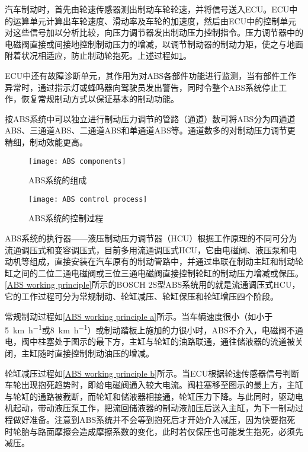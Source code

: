 \documentclass[UTF8]{ctexart}
\numberwithin{figure}{section}
\numberwithin{table}{section}
\begin{document}
汽车制动时，首先由轮速传感器测出制动车轮轮速，并将信号送入ECU。ECU中的运算单元计算出车轮速度、滑动率及车轮的加速度，然后由ECU中的控制单元对这些信号加以分析比较，向压力调节器发出制动压力控制指令。压力调节器中的电磁阀直接或间接地控制制动压力的增减，以调节制动器的制动力矩，使之与地面附着状况相适应，防止制动轮抱死。上述过程如\cref{ABS control process}。

ECU中还有故障诊断单元，其作用为对ABS各部件功能进行监测，当有部件工作异常时，通过指示灯或蜂鸣器向驾驶员发出警告，同时令整个ABS系统停止工作，恢复常规制动方式以保证基本的制动功能。

按ABS系统中可以独立进行制动压力调节的管路（通道）数可将ABS分为四通道ABS、三通道ABS、二通道ABS和单通道ABS等。通道数多的对制动压力调节更精细，制动效能更高。

\begin{figure}[htbp]
	\centering
	\begin{minipage}[b]{0.8\textwidth}
		\centering
		\texttt{[image: ABS components]}
		\caption{ABS系统的组成}
		\label{ABS components}
	\end{minipage}
	\begin{minipage}[b]{0.8\textwidth}
		\centering
		\texttt{[image: ABS control process]}
		\caption{ABS系统的控制过程}
		\label{ABS control process}
	\end{minipage}
\end{figure}

ABS系统的执行器——液压制动压力调节器（HCU）根据工作原理的不同可分为流通调压式和变容调压式，目前多用流通调压式HCU，它由电磁阀、液压泵和电动机等组成，直接安装在汽车原有的制动管路中，并通过串联在制动主缸和制动轮缸之间的二位二通电磁阀或三位三通电磁阀直接控制轮缸的制动压力增减或保压。\cref{ABS working principle}所示的BOSCH 2S型ABS系统用的就是流通调压式HCU，它的工作过程可分为常规制动、轮缸减压、轮缸保压和轮缸增压四个阶段。

常规制动过程如\cref{ABS working principle a}所示。当车辆速度很小（如小于\SI[per-mode = symbol]{5}{\km\per\hour}或\SI[per-mode = symbol]{8}{\km\per\hour}）或制动踏板上施加的力很小时，ABS不介入，电磁阀不通电，阀中柱塞处于图示的最下方，主缸与轮缸的油路联通，通往储液器的流道被关闭，主缸随时直接控制制动油压的增减。

轮缸减压过程如\cref{ABS working principle b}所示。当ECU根据轮速传感器信号判断车轮出现抱死趋势时，即给电磁阀通入较大电流。阀柱塞移至图示的最上方，主缸与轮缸的通路被截断，而轮缸和储液器相接通，轮缸压力下降。与此同时，驱动电机起动，带动液压泵工作，把流回储液器的制动液加压后送入主缸，为下一制动过程做好准备。注意到ABS系统并不会等到抱死后才开始介入减压，因为快要抱死时轮胎与路面摩擦会造成摩擦系数的变化，此时若仅保压也可能发生抱死，必须先减压。
\end{document}
